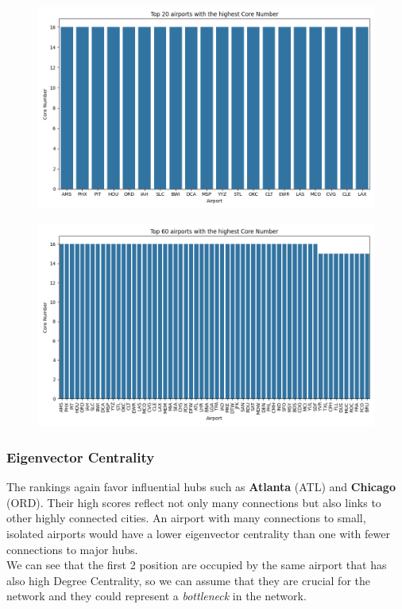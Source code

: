 \documentclass[12pt]{article}
\begin{document}
    \begin{figure}[H]
        \centering
        \includegraphics[width=0.8\linewidth]{img/core_number}
    \end{figure}
    \begin{figure}[H]
        \centering
        \includegraphics[width=0.8\linewidth]{img/more_core_number}
    \end{figure}
    

    \subsubsection{Eigenvector Centrality}
    The rankings again favor influential hubs such as \textbf{Atlanta} (ATL) and \textbf{Chicago} (ORD). Their high scores reflect not only many connections but also links to other highly connected cities. An airport with many connections to small, isolated airports would have a lower eigenvector centrality than one with fewer connections to major hubs.\\
    We can see that the first 2 position are occupied by the same airport that has also high Degree Centrality, so we can assume that they are crucial for the network and they could represent a \textit{bottleneck} in the network.\\    
\end{document}
